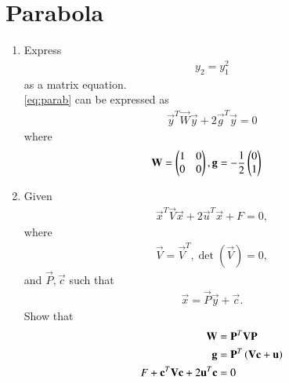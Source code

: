 \documentclass[journal,12pt,twocolumn]{IEEEtran}
\renewcommand\thesection{\arabic{section}}
\begin{document}
\section{Parabola}
\begin{enumerate}[label=\thesection.\arabic*
,ref=\thesection.\theenumi]
\item Express 
\begin{align}
y_2 = y_1^2
\label{eq:parab}
\end{align}
as a matrix equation.
\\
\solution  \eqref{eq:parab} can be expressed as
\begin{align}
\vec{y}^T\vec{W}\vec{y}+2\vec{g}^T\vec{y} = 0
\label{eq:parab_mat}
\end{align}
%
where 
\begin{align}
\mathbf{W} = \begin{pmatrix}1 & 0 \\ 0 & 0\end{pmatrix} 
,
\mathbf{g} &= -\frac{1}{2}\begin{pmatrix}0 \\ 1\end{pmatrix}
\label{eq:parab_coeffs}
\end{align}
%
\item Given 
\begin{align}
\vec{x}^T\vec{V}\vec{x}+2\vec{u}^T\vec{x}+ F = 0,
\label{eq:parab_gen}
\end{align}
where 
\begin{align}
\vec{V}=\vec{V}^T, \det(\vec{V}) = 0,
\label{eq:parab_vcond}
\end{align}
%
and $\vec{P}, \vec{c}$ such that
\begin{align}
\vec{x} = \vec{P}\vec{y}+\vec{c}.
\label{eq:parab_affine}
\end{align}
Show that
\begin{align}
\begin{split}
\mathbf{W} &= \mathbf{P}^T\mathbf{V}\mathbf{P}
\\
\mathbf{g} &= \mathbf{P}^T\left(\mathbf{V}\mathbf{c}+\mathbf{u}\right)
\\
F+ \mathbf{c}^T\mathbf{V}\mathbf{c} + 2\mathbf{u}^T\mathbf{c}&= 0
\end{split}
\label{eq:parab_parmas}
\end{align}


\end{enumerate}
\end{document}

